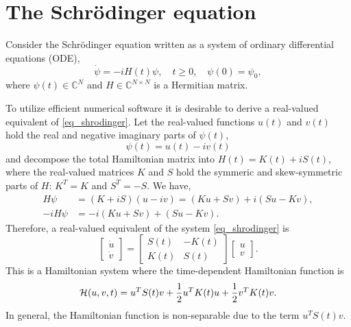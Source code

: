 \documentclass[11pt]{article}
\begin{document}



\section{The Schr\"odinger equation}
Consider the Schr\"odinger equation written as a system of ordinary differential equations (ODE),
\begin{equation}\label{eq_shrodinger}
\dot{\psi} = -i H(t) \psi,\quad t\geq 0,\quad \psi(0) = \psi_0,
\end{equation}
where $\psi(t)\in {\mathbb C}^N$ and $H\in {\mathbb C}^{N\times N}$ is a Hermitian matrix.

To utilize efficient numerical software it is desirable to derive a real-valued equivalent of
\eqref{eq_shrodinger}. Let the real-valued functions $u(t)$ and $v(t)$ hold the real and negative
imaginary parts of $\psi(t)$,
\[
\psi(t) = u(t) - iv(t)
\]
and decompose the total Hamiltonian matrix into $H(t) = K(t) + i S(t)$, where the real-valued
matrices $K$ and $S$ hold the symmeric and skew-symmetric parts of $H$: $K^T = K$ and $S^T =
-S$. We have,
\begin{align*}
H\psi &= (K+iS)(u - iv) = (Ku + Sv) + i(Su - Kv),\\
-iH\psi &= -i(Ku + Sv) + (Su - Kv).
\end{align*}
Therefore, a real-valued equivalent of the system \eqref{eq_shrodinger} is
\begin{equation}\label{eq_real-shrodinger}
  \begin{bmatrix} \dot{u}\\ \dot{v} \end{bmatrix} =
%
  \begin{bmatrix}
    S(t) & -K(t) \\ K(t) & S(t)
  \end{bmatrix}     
  \begin{bmatrix} u\\ v \end{bmatrix} .
\end{equation}
This is a Hamiltonian system where the time-dependent Hamiltonian function is
\begin{equation}\label{eq_hamiltonian}
{\cal H}(u,v,t) = u^T S(t) v + \frac{1}{2} u^T K(t) u + \frac{1}{2} v^T K(t) v.
\end{equation}
In general, the Hamiltonian function is non-separable due to the term $u^TS(t) v$.
\end{document}
